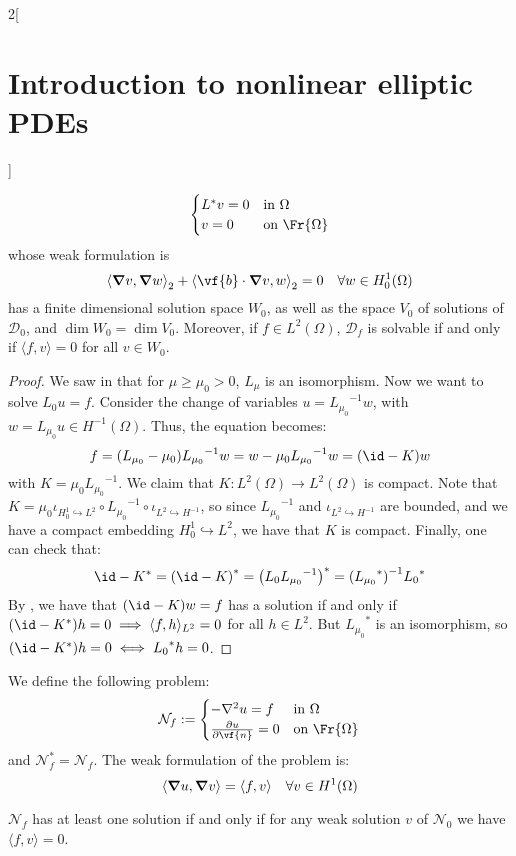 \documentclass[../../../main_math.tex]{subfiles}
\begin{document}
\begin{multicols}{2}[\section{Introduction to nonlinear elliptic PDEs}]
\begin{proposition}
$$\begin{cases}
        L^*v=0 & \text{in }\Omega      \\
        v=0    & \text{on }\Fr{\Omega}
      \end{cases}
    $$
    whose weak formulation is
    \begin{equation*}
      {\langle \grad v,\grad w\rangle}_2+{\langle \vf{b}\cdot \grad v,w\rangle}_2=0\quad \forall w\in H_0^1(\Omega)
    \end{equation*}
    has a finite dimensional solution space $W_0$, as well as the space $V_0$ of solutions of $\mathcal{D}_0$, and $\dim W_0=\dim V_0$. Moreover, if $f\in L^2(\Omega)$, $\mathcal{D}_f$ is solvable if and only if $\langle f,v\rangle=0$ for all $v\in W_0$.
  \end{proposition}
  \begin{proof}
    We saw in  that for $\mu\geq \mu_0>0$, $L_\mu$ is an isomorphism. Now we want to solve $L_0u=f$. Consider the change of variables $u={L_{\mu_0}}^{-1}w$, with $w=L_{\mu_0}u\in H^{-1}(\Omega)$. Thus, the equation becomes:
    $$
      f= (L_{\mu_0}-\mu_0){L_{\mu_0}}^{-1}w=w-\mu_0 {L_{\mu_0}}^{-1}w=(\id-K)w
    $$
    with $K=\mu_0 {L_{\mu_0}}^{-1}$. We claim that $K:L^2(\Omega)\to L^2(\Omega)$ is compact. Note that $K=\mu_0\iota_{H_0^1\hookrightarrow L^2}\circ {L_{\mu_0}}^{-1}\circ \iota_{L^2\hookrightarrow H^{-1}}$, so since ${L_{\mu_0}}^{-1}$ and $\iota_{L^2\hookrightarrow H^{-1}}$ are bounded, and we have a compact embedding $H_0^1\hookrightarrow L^2$, we have that $K$ is compact. Finally, one can check that:
    $$
      \id-K^*={(\id-K)}^*={\left(L_0{L_{\mu_0}}^{-1}\right)}^*={({L_{\mu_0}}^*)}^{-1}{L_0}^{*}
    $$
    By , we have that $(\id-K)w=f$ has a solution if and only if $(\id-K^*)h=0\implies \langle f,h\rangle_{L^2} =0$ for all $h\in L^2$. But ${L_{\mu_0}}^*$ is an isomorphism, so $(\id-K^*)h=0\iff {L_0}^*h=0$.
  \end{proof}
  \begin{definition}
    We define the following problem:
    $$
      \mathcal{N}_f:=\begin{cases}
        -\laplacian u=f   & \text{in }\Omega      \\
        \pdv{u}{\vf{n}}=0 & \text{on }\Fr{\Omega}
      \end{cases}
    $$
    and $\mathcal{N}_f^*=\mathcal{N}_f$. The weak formulation of the problem is:
    \begin{equation*}
      \langle \grad u,\grad v\rangle=\langle f,v\rangle\quad \forall v\in H^1(\Omega)
    \end{equation*}
  \end{definition}
  \begin{proposition}
    $\mathcal{N}_f$ has at least one solution if and only if for any weak solution $v$ of $\mathcal{N}_0$ we have $\langle f,v\rangle=0$.
  \end{proposition}

\end{multicols}
\end{document}
